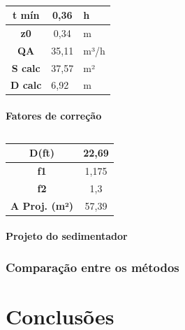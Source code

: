 \begin{table}[H]
	\centering
	\begin{tabular}{|c|c|l|}
		\hline
		\textbf{t mín} & 0,36 & h \\ \hline
		\textbf{z0} & 0,34 & m \\ \hline
		\textbf{QA} & 35,11 & m³/h \\ \hline
		\textbf{S calc} & 37,57 & m² \\ \hline
		\multicolumn{1}{|l|}{\textbf{D calc}} & \multicolumn{1}{l|}{6,92} & m \\ \hline
	\end{tabular}
	\caption{}
	\label{aMIN}
\end{table}







\subsubsection{Fatores de correção}

\begin{table}[H]
	\centering
	\begin{tabular}{|c|c|}
		\hline
		\textbf{D(ft)} & 22,69 \\ \hline
		\textbf{f1} & 1,175 \\ \hline
		\textbf{f2} & 1,3 \\ \hline
		\textbf{A Proj. (m²)} & 57,39 \\ \hline
	\end{tabular}
	\caption{}
	\label{aMIn}
\end{table}

\subsubsection{Projeto do sedimentador}

\subsection{Comparação entre os métodos}

\chapter{Conclusões}
